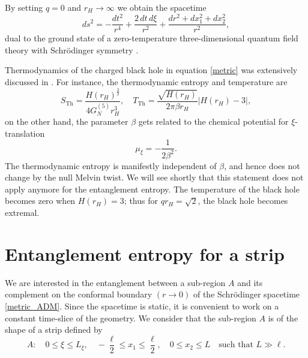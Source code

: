 \documentclass[12pt,a4paper]{article}
\numberwithin{equation}{section}
\begin{document}
By setting $q=0$ and $r_H\to \infty$ we obtain the spacetime
%
\begin{equation}
	ds^2 = -\frac{dt^2}{r^4} + \frac{2\,dt\, d\xi}{r^2} + \frac{dr^2 + dx_1^2 + dx_2^2}{r^2},
\end{equation}
%
dual to the ground state of a zero-temperature three-dimensional quantum field theory with Schr\"{o}dinger symmetry \cite{Son:2008ye}.

Thermodynamics of the charged black hole in equation \eqref{metric} was extensively discussed in \cite{Adams:2009dm}. For instance, the thermodynamic entropy and temperature are
%
\begin{equation}
    S_{\mathrm{Th}} = \frac{H\left( r_H \right)^{\frac{3}{2}}}{4 G_N^{(5)} r_H^3}, \quad T_{\mathrm{Th}} = \frac{\sqrt{H\left(r_H\right)}}{2\pi\beta r_H} \lvert H\left(r_H\right) - 3\rvert,
\end{equation}
%
on the other hand, the parameter $\beta$ gets related to the chemical potential for $\xi$-translation
%
\begin{equation} \label{eqn:chempot}
    \mu_{\xi} = - \frac{1}{2\beta^2}.
\end{equation}
%
The thermodynamic entropy is manifestly independent of $\beta$, and hence does not change by the null Melvin twist. We will see shortly that this statement does not apply anymore for the entanglement entropy. The temperature of the black hole becomes zero when $H\left(r_H\right) = 3$; thus for $q r_H = \sqrt{2}$, the black hole becomes extremal.

\section{Entanglement entropy for a strip} \label{sec3}

We are interested in the entanglement between a sub-region $A$ and its complement on the conformal boundary $\left(r\to 0 \right)$ of the Schr\"{o}dinger spacetime \eqref{metric_ADM}. Since the spacetime is static, it is convenient to work on a constant time-slice of the geometry. We consider that the sub-region $A$ is of the shape of a strip defined by
\[A: \quad 0\leq \xi\leq L_{\xi}, \quad -\frac{\ell}{2}\leq x_1 \leq \frac{\ell}{2}, \quad 0\leq x_2\leq L \quad \text{such that } L\gg \ell. \]
\end{document}
